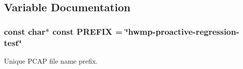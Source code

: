 \subsection{Variable Documentation}
\subsubsection[{\texorpdfstring{P\+R\+E\+F\+IX}{PREFIX}}]{\setlength{\rightskip}{0pt plus 5cm}const char$\ast$ const P\+R\+E\+F\+IX = \char`\"{}hwmp-\/proactive-\/regression-\/{\bf test}\char`\"{}}\hypertarget{hwmp-proactive-regression_8cc_a61dc66981fa47bfd0066a57a487c599c}{}\label{hwmp-proactive-regression_8cc_a61dc66981fa47bfd0066a57a487c599c}


Unique P\+C\+AP file name prefix. 

